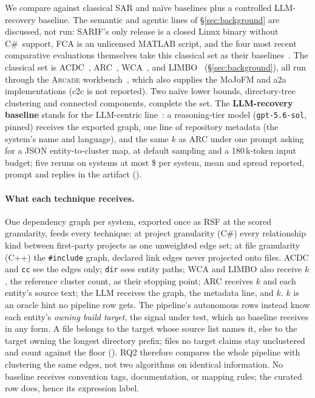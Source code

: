 We compare against \rqTwoBaselineCount{} classical SAR and na\"ive baselines plus a controlled
LLM-recovery baseline. The semantic and agentic lines of \S\ref{sec:background} are discussed, not
run: SARIF's only release is a closed Linux binary without C\#\ support, FCA is an unlicensed
MATLAB script, and the four most recent comparative evaluations themselves take this classical
set as their baselines~\cite{zhang2023sarif,zhao2026semarc,ding2026ssar,zhang2026semref}. The
classical set is ACDC~\cite{acdc}, ARC~\cite{arc}, WCA~\cite{wca}, and LIMBO~\cite{limbo}
(\S\ref{sec:background}), all run through the
\textsc{Arcade} workbench~\cite{arcade}, which also supplies the MoJoFM and a2a implementations
(c2c is not reported). Two na\"ive lower
bounds, directory-tree clustering and connected components, complete the set. The
\textbf{LLM-recovery baseline} stands for the LLM-centric line~\cite{archagent}: a reasoning-tier
model (\texttt{gpt-5.6-sol}, pinned) receives the exported graph, one line of repository
metadata (the system's name and language), and the same $k$ as ARC under one prompt asking for a JSON entity-to-cluster map, at
default sampling and a 180\,k-token input budget; five reruns on \rqTwoLlmSystemsRan{} systems at
most \$\rqTwoLlmCostMaxUsd{} per system, mean and spread reported, prompt and replies in the
artifact (\trInputs{}).

\paragraph{What each technique receives.} One dependency graph per system, exported once as RSF at
the scored granularity, feeds every technique: at project granularity (C\#) every relationship
kind between first-party projects as one unweighted edge set; at file granularity (C++) the
\texttt{\#include} graph, declared link edges never projected onto files. ACDC and
\texttt{cc} see the edges only; \texttt{dir} sees entity paths; WCA and LIMBO also receive $k$,
the reference cluster count, as their stopping point; ARC receives $k$ and each entity's source
text; the LLM receives the graph, the metadata line, and $k$. $k$ is an oracle hint no pipeline
row gets. The pipeline's autonomous rows instead know each entity's \emph{owning build target},
the signal under test, which no baseline receives in any form. A file belongs to the target whose
source list names it, else to the target owning the longest directory prefix; files no target
claims stay unclustered and count against the floor (\trInputs{}). RQ2 therefore compares the
whole pipeline with clustering the same edges, not two algorithms on identical information. No
baseline receives convention tags, documentation, or mapping rules; the curated row does, hence
its expression label.


